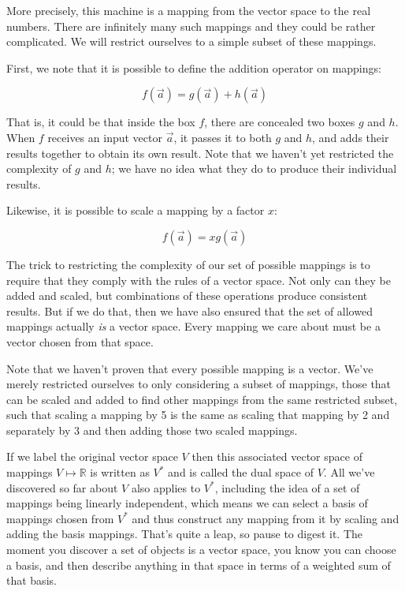 More precisely, this machine is a mapping from the vector space to the real numbers. There are infinitely many such mappings and they could be rather complicated. We will restrict ourselves to a simple subset of these mappings.

First, we note that it is possible to define the addition operator on mappings:

$$
f(\vec{a}) = g(\vec{a}) + h(\vec{a})
$$

That is, it could be that inside the box $f$, there are concealed two boxes $g$ and $h$. When $f$ receives an input vector $\vec{a}$, it passes it to both $g$ and $h$, and adds their results together to obtain its own result. Note that we haven't yet restricted the complexity of $g$ and $h$; we have no idea what they do to produce their individual results.

Likewise, it is possible to scale a mapping by a factor $x$:

$$
f(\vec{a}) = x g(\vec{a})
$$

The trick to restricting the complexity of our set of possible mappings is to require that they comply with the rules of a vector space. Not only can they be added and scaled, but combinations of these operations produce consistent results. But if we do that, then we have also ensured that the set of allowed mappings actually \textit{is} a vector space. Every mapping we care about must be a vector chosen from that space.

Note that we haven't proven that every possible mapping is a vector. We've merely restricted ourselves to only considering a subset of mappings, those that can be scaled and added to find other mappings from the same restricted subset, such that scaling a mapping by 5 is the same as scaling that mapping by 2 and separately by 3 and then adding those two scaled mappings.

If we label the original vector space $V$ then this associated vector space of mappings $V \mapsto \mathbb{R}$ is written as $V^*$ and is called the dual space of $V$. All we've discovered so far about $V$ also applies to $V^*$, including the idea of a set of mappings being linearly independent, which means we can select a basis of mappings chosen from $V^*$ and thus construct any mapping from it by scaling and adding the basis mappings. That's quite a leap, so pause to digest it. The moment you discover a set of objects is a vector space, you know you can choose a basis, and then describe anything in that space in terms of a weighted sum of that basis.

